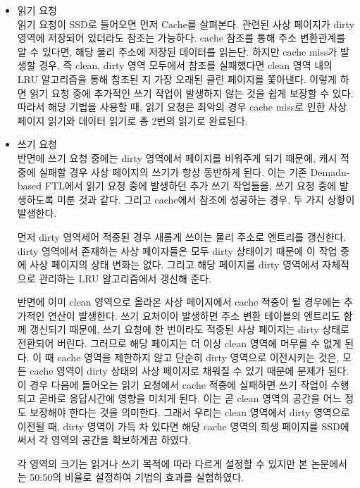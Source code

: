 \documentclass[conference]{IEEEtran}
\begin{document}
\begin{itemize}
	\item{읽기 요청}\\
	읽기 요청이 SSD로 들어오면 먼저 Cache를 살펴본다. 관련된 사상 페이지가 dirty 영역에 저장되어 
	있더라도 참조는 가능하다. cache 참조를 통해 주소 변환관계를 알 수 있다면, 해당 물리 주소에 
	저장된 데이터를 읽는단. 하지만 cache miss가 발생할 경우, 즉 clean, dirty 영역 모두에서 참조를
	실패했다면 clean 영역 내의 LRU 알고리즘을 통해 참조된 지 가장 오래된 클린 페이지를 쫓아낸다.
	이렇게 하면 읽기 요청 중에 추가적인 쓰기 작업이 발생하지 않는 것을 쉽게 보장할 수 있다.
	따라서 해당 기법을 사용할 때, 읽기 요청은 최악의 경우 cache miss로 인한 사상 페이지 읽기와
	데이터 읽기로 총 2번의 읽기로 완료된다.

	\item{쓰기 요청}\\
	반면에 쓰기 요청 중에는 dirty 영역에서 페이지를 비워주게 되기 때문에, 캐시 적중에 실패할 경우
	사상 페이지의 쓰기가 항상 동반하게 된다. 이는 기존 Demadn-based FTL에서 읽기 요청 중에 발생하던
	추가 쓰기 작업들을, 쓰기 요청 중에 발생하도록 미룬 것과 같다. 그리고 cache에서 참조에 성공하는
	경우, 두 가지 상황이 발생한다.\par

	먼저 dirty 영역세어 적중된 경우 새롬게 쓰이는 물리 주소로 엔트리를 갱신한다. dirty 영역에서
	존재하는 사상 페이자들은 모두 dirty 상태이기 때문에 이 작업 중에 사상 페이지의 상태 변화는 없다.
	그리고 해당 페이지를 dirty 영역에서 자체적으로 관리하는 LRU 알고리즘에서 갱신해 준다.\par

	반면에 이미 clean 영역으로 올라온 사상 페이지에서 cache 적중이 될 경우에는 추가적인 연산이
	발생한다. 쓰기 요처이이 발생하면 주소 변환 테이블의 엔트리도 함께 갱신되기 때문에, 쓰기 요청에
	한 번이라도 적중된 사상 페이지는 dirty 상태로 전환되어 버린다. 그러므로 해당 페이지는 더 이상
	clean 영역에 머무를 수 없게 된다. 이 때 cache 영역을 제한하지 않고 단순히 dirty 영역으로
	이전시키는 것은, 모든 cache 영역이 dirty 상태의 사상 페이지로 채워질 수 있기 때문에 문제가 된다.
	이 경우 다음에 들어오는 읽기 요청에서 cache 적중에 실패하면 쓰기 작업이 수행되고 곧바로
	응답시간에 영향을 미치게 된다. 이는 곧 clean 영역의 공간을 어느 정도 보장해야 한다는 것을 
	의미한다. 그래서 우리는 clean 영역에서 dirty 영역으로 이전될 때, dirty 영역이 가득 차 있다면
	해당 cache 영역의 희생 페이지를 SSD에 써서 각 영역의 공간을 확보하게끔 하였다.\par

	각 영역의 크기는 읽거나 쓰기 목적에 따라 다르게 설정할 수 있지만 본 논문에서는 50:50의 비율로 
	설정하여 기법의 효과를 실험하였다.
\end{itemize}
\end{document}
